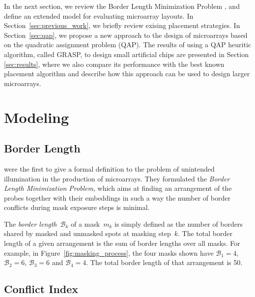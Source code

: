 \documentclass{bioinfo}
\begin{document}
In the next section, we review the Border Length Minimization Problem \citep{HANNENHALLI02}, and define an extended model for evaluating microarray layouts. In Section~\ref{sec:previous_work}, we briefly review exising placement strategies. In Section~\ref{sec:qap}, we propose a new approach to the design of microarrays based on the quadratic assignment problem (QAP). The results of using a QAP heuritic algorithm, called GRASP, to design small artificial chips are presented in Section \ref{sec:results}, where we also compare its performance with the best known placement algorithm and describe how this approach can be used to design larger microarrays.

\section{Modeling}
\label{sec:modelling}

\subsection{Border Length}

\citet{HANNENHALLI02} were the first to give a formal definition to the problem of unintended illumination in the production of microarrays. They formulated the \emph{Border Length Minimization Problem}, which aims at finding an arrangement of the probes together with their embeddings in such a way the number of border conflicts during mask exposure steps is minimal.

The \emph{border length}~$\mathcal{B}_k$ of a mask~$m_{k}$ is simply
defined as the number of borders shared by masked and unmasked spots
at masking step~$k$. The total border length of a given arrangement is
the sum of border lengths over all masks. For example, in
Figure~\ref{fig:masking_process}, the four masks shown have $\mathcal{B}_1 = 4$, $\mathcal{B}_2 = 6$, $\mathcal{B}_3 = 6$ and $\mathcal{B}_4 = 4$. The total border length of that arrangement is 50.

\subsection{Conflict Index}
\end{document}
